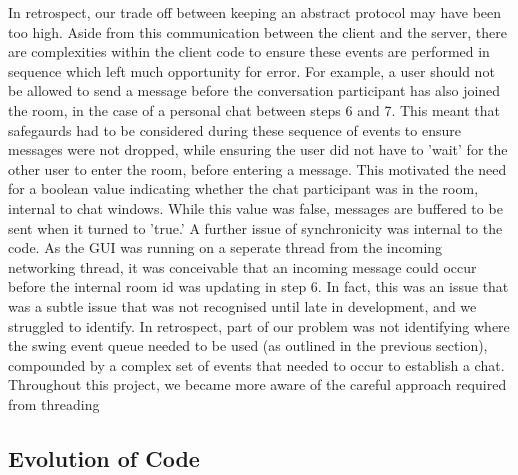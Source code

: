 In retrospect, our trade off between keeping an abstract protocol may have been too high. Aside from this communication between the client and the server, there are complexities within the client code to ensure these events are performed in sequence which left much opportunity for error. For example, a user should not be allowed to send a message before the conversation participant has also joined the room, in the case of a personal chat between steps 6 and 7. This meant that safegaurds had to be considered during these sequence of events to ensure messages were not dropped, while ensuring the user did not have to 'wait' for the other user to enter the room, before entering a message. This motivated the need for a boolean value indicating whether the chat participant was in the room, internal to chat windows. While this value was false, messages are buffered to be sent when it turned to 'true.' A further issue of synchronicity was internal to the code. As the GUI was running on a seperate thread from the incoming networking thread, it was conceivable that an incoming message could occur before the internal room id was updating in step 6. In fact, this was an issue that was a subtle issue that was not recognised until late in development, and we struggled to identify. In retrospect, part of our problem was not identifying where the swing event queue needed to be used (as outlined in the previous section), compounded by a complex set of events that needed to occur to establish a chat. Throughout this project, we became more aware of the careful approach required from threading 





\subsection{Evolution of Code}
